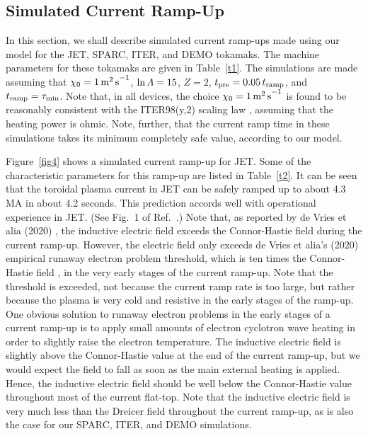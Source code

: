 \documentclass{iopjournal}
\begin{document}
\subsection{Simulated Current Ramp-Up}
In this section, we shall describe simulated current ramp-ups made using our model for the JET, SPARC,  ITER, and DEMO  tokamaks. The
machine parameters for these tokamaks are given in Table~\ref{t1}. The simulations are made assuming that $\chi_0=1\,{\rm m^2\,s}^{-1}$,
$\ln{\mit\Lambda} = 15$, $Z=2$, $t_{\rm pre}= 0.05\,t_{\rm ramp}$, and $t_{\rm ramp} =\tau_{\rm min}$. 
Note that, in all devices,  the choice $\chi_0=1\,{\rm m^2\,s}^{-1}$ is found to be reasonably consistent with the ITER98(y,2) scaling law \cite{scaling}, assuming that the
heating power is ohmic. 
Note, further, that the current ramp time in these simulations takes its
minimum completely safe value, according to our model. 

Figure~\ref{fig4} shows a simulated current ramp-up for JET. Some of the characteristic  parameters for this ramp-up are listed in Table~\ref{t2}. 
It can be seen that the toroidal plasma current in JET can be safely ramped up to about 4.3 MA in about 4.2 seconds. This prediction accords well
with operational experience in JET. (See Fig.~1 of Ref.~\cite{jet}.)
Note that, as reported by de Vries et alia (2020) \cite{run}, the inductive electric field exceeds the Connor-Hastie field during the current ramp-up. However,
the electric field only exceeds de Vries et alia's (2020) empirical runaway electron problem threshold, which is ten times the Connor-Hastie field \cite{run}, in
the very early stages of the current ramp-up. Note that the threshold is exceeded, not because the current ramp  rate is too large, but rather because the
plasma is very cold and resistive in the early stages of the ramp-up. One obvious solution to runaway electron problems in the early
stages of a current ramp-up is to apply small amounts of electron cyclotron wave heating in order to slightly raise the electron temperature. 
The inductive electric field is slightly above the Connor-Hastie value at the end of the current ramp-up, but we would expect the field to
fall as soon as the main external heating is applied. Hence, the inductive electric field should be well below the Connor-Hastie
value throughout most of the current flat-top. Note that the inductive electric field is very much less than the Dreicer field throughout the current ramp-up, as is also
the case for our SPARC,  ITER, and DEMO simulations. 
\end{document}
